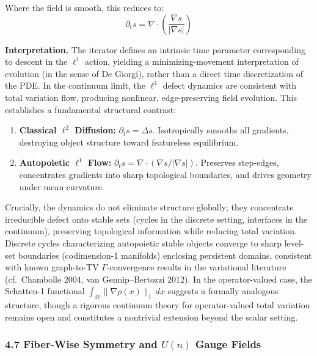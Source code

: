 \documentclass[
]{article}
\providecommand{\tightlist}{%
  \setlength{\itemsep}{0pt}\setlength{\parskip}{0pt}}
\begin{document}
Where the field is smooth, this reduces to:
\[ \partial_t s = \nabla \cdot \left( \frac{\nabla s}{|\nabla s|} \right) \]

\textbf{Interpretation.} The iterator defines an intrinsic time
parameter corresponding to descent in the \(\ell^1\) action, yielding a
minimizing-movement interpretation of evolution (in the sense of De
Giorgi), rather than a direct time discretization of the PDE. In the
continuum limit, the \(\ell^1\) defect dynamics are consistent with
total variation flow, producing nonlinear, edge-preserving field
evolution. This establishes a fundamental structural contrast:

\begin{enumerate}
\def\labelenumi{\arabic{enumi}.}
\tightlist
\item
  \textbf{Classical \(\ell^2\) Diffusion:} \(\partial_t s = \Delta s\).
  Isotropically smooths all gradients, destroying object structure
  toward featureless equilibrium.
\item
  \textbf{Autopoietic \(\ell^1\) Flow:}
  \(\partial_t s = \nabla \cdot (\nabla s / |\nabla s|)\). Preserves
  step-edges, concentrates gradients into sharp topological boundaries,
  and drives geometry under mean curvature.
\end{enumerate}

Crucially, the dynamics do not eliminate structure globally; they
concentrate irreducible defect onto stable sets (cycles in the discrete
setting, interfaces in the continuum), preserving topological
information while reducing total variation. Discrete cycles
characterizing autopoietic stable objects converge to sharp level-set
boundaries (codimension-1 manifolds) enclosing persistent domains,
consistent with known graph-to-TV \(\Gamma\)-convergence results in the
variational literature (cf.~Chambolle 2004, van Gennip--Bertozzi 2012).
In the operator-valued case, the Schatten-1 functional
\(\int_\Omega \|\nabla \rho(x)\|_1 \, dx\) suggests a formally analogous
structure, though a rigorous continuum theory for operator-valued total
variation remains open and constitutes a nontrivial extension beyond the
scalar setting.

\subsubsection{\texorpdfstring{4.7 Fiber-Wise Symmetry and \(U(n)\)
Gauge
Fields}{4.7 Fiber-Wise Symmetry and U(n) Gauge Fields}}\label{fiber-wise-symmetry-and-un-gauge-fields}
\end{document}

